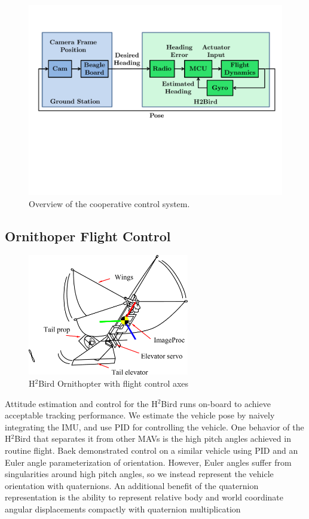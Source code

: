 \documentclass{aamas2013}
\begin{document}
\begin{figure}[tb]
\centering
\includegraphics[width=\linewidth]{figures/process_flow.pdf}
\caption{Overview of the cooperative control system.}
\label{fig:process_flow}
\end{figure}

\subsection{Ornithoper Flight Control}

\begin{figure}[tb]
\centering
\includegraphics[height=150pt]{figures/h2bird_axes.pdf}
\caption{H$^2$Bird Ornithopter with flight control axes}
\label{fig:h2Bird_axes}
\end{figure}

Attitude estimation and control for the H$^2$Bird runs on-board to achieve 
acceptable tracking performance. We estimate the vehicle pose by naively
integrating the IMU, and use PID for controlling the vehicle.
One behavior of the H$^2$Bird that separates it from other MAVs is the
high pitch angles achieved in routine flight. Baek\cite{baek:tracking} 
demonstrated control on a similar vehicle using PID and an Euler angle
parameterization of orientation. However, Euler angles suffer from singularities
around high pitch angles, so we instead represent the vehicle orientation
with quaternions. An additional benefit of the quaternion representation is 
the ability to represent relative body and world coordinate angular displacements 
compactly with quaternion multiplication
\end{document}
